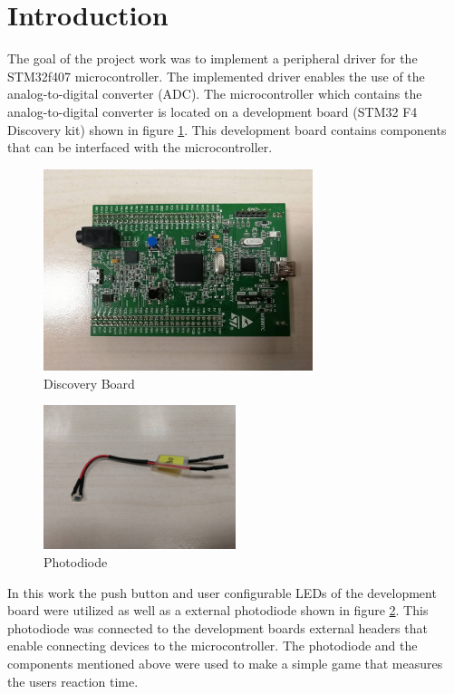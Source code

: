 \section{Introduction}
The goal of the project work was to implement a peripheral driver for the STM32f407 microcontroller. The implemented driver enables the use of the analog-to-digital converter (ADC). The microcontroller which contains the analog-to-digital converter is located on a development board (STM32 F4 Discovery kit) shown in figure \ref{fig:Board}. This development board contains components that can be interfaced with the microcontroller.\\

\begin{figure}[htbp]
  \centering
     \includegraphics[width=0.7\textwidth]{./figures/board.jpg}
  \caption{Discovery Board}
  \label{fig:Board}
\end{figure}

\begin{figure}[htbp]
  \centering
     \includegraphics[width=0.5\textwidth]{./figures/photodiode.jpg}
  \caption{Photodiode}
  \label{fig:photodiode}
\end{figure}

\par
In this work the push button and user configurable LEDs of the development board were utilized as well as a external photodiode shown in figure \ref{fig:photodiode}. This photodiode was connected to the development boards external headers that enable connecting devices to the microcontroller. The photodiode and the components mentioned above were used to make a simple game that measures the users reaction time.

